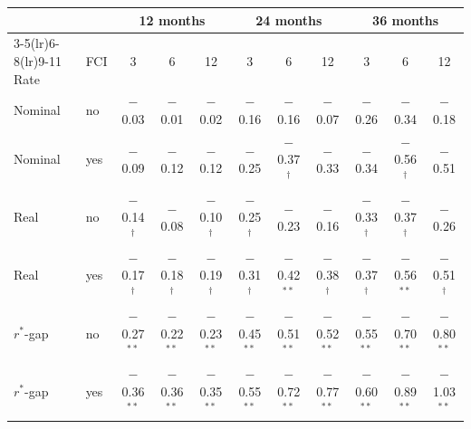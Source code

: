 \begin{tabular}{llccccccccc}
\toprule
 & & \multicolumn{3}{c}{12 months} & \multicolumn{3}{c}{24 months} & \multicolumn{3}{c}{36 months}\\
\cmidrule(lr){3-5}\cmidrule(lr){6-8}\cmidrule(lr){9-11}
Rate & FCI & 3 & 6 & 12 & 3 & 6 & 12 & 3 & 6 & 12 \\
\midrule
Nominal & no & $-$0.03 & $-$0.01 & $-$0.02 & $-$0.16 & $-$0.16 & $-$0.07 & $-$0.26 & $-$0.34 & $-$0.18 \\
Nominal & yes & $-$0.09 & $-$0.12 & $-$0.12 & $-$0.25 & $-$0.37$^{\dagger}$ & $-$0.33 & $-$0.34 & $-$0.56$^{\dagger}$ & $-$0.51 \\
\midrule
Real & no & $-$0.14$^{\dagger}$ & $-$0.08 & $-$0.10$^{\dagger}$ & $-$0.25$^{\dagger}$ & $-$0.23 & $-$0.16 & $-$0.33$^{\dagger}$ & $-$0.37$^{\dagger}$ & $-$0.26 \\
Real & yes & $-$0.17$^{\dagger}$ & $-$0.18$^{\dagger}$ & $-$0.19$^{\dagger}$ & $-$0.31$^{\dagger}$ & $-$0.42$^{**}$ & $-$0.38$^{\dagger}$ & $-$0.37$^{\dagger}$ & $-$0.56$^{**}$ & $-$0.51$^{\dagger}$ \\
\midrule
$r^*$-gap & no & $-$0.27$^{**}$ & $-$0.22$^{**}$ & $-$0.23$^{**}$ & $-$0.45$^{**}$ & $-$0.51$^{**}$ & $-$0.52$^{**}$ & $-$0.55$^{**}$ & $-$0.70$^{**}$ & $-$0.80$^{**}$ \\
$r^*$-gap & yes & $-$0.36$^{**}$ & $-$0.36$^{**}$ & $-$0.35$^{**}$ & $-$0.55$^{**}$ & $-$0.72$^{**}$ & $-$0.77$^{**}$ & $-$0.60$^{**}$ & $-$0.89$^{**}$ & $-$1.03$^{**}$ \\
\bottomrule
\end{tabular}
